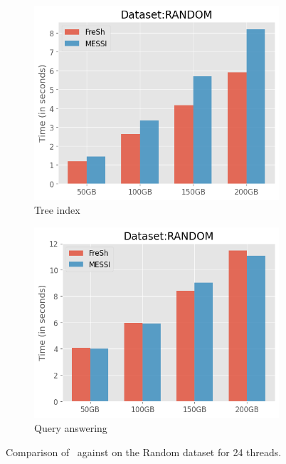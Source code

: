 \begin{figure}[htbp]
    \vspace{0.2cm} %

    \begin{subfigure}{0.48\textwidth}
        \includegraphics[width=\textwidth]{figures/Experiments/scale-dataset-random-tree.png}
        \caption{Tree index}
        \label{fig:eval:scale-dataset:random:tree-index}
    \end{subfigure}    
    \begin{subfigure}{0.48\textwidth}
        \includegraphics[width=\textwidth]{figures/Experiments/scale-dataset-random-query.png}
        \caption{Query answering}
        \label{fig:eval:scale-dataset:random:query-answering}
    \end{subfigure}                

    \caption{Comparison of \Fresh\ against \MESSI on the Random dataset for 24 threads.}
    \label{fig:eval:scale-dataset:random}
\end{figure}

